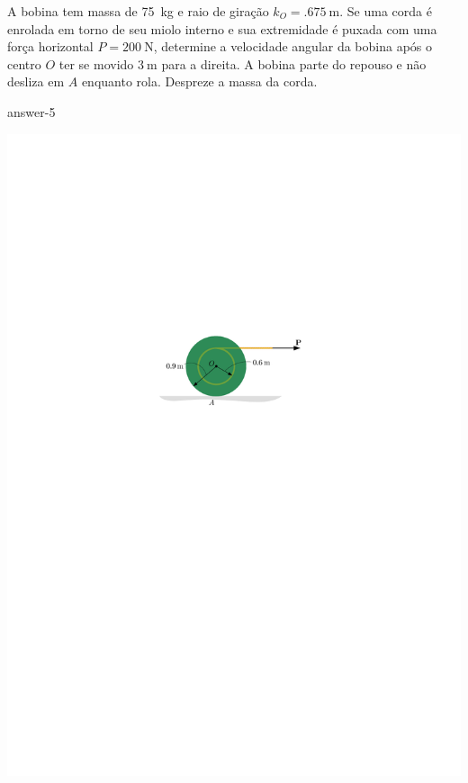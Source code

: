 \item A bobina tem massa de \SI{75}{\kilogram} e raio de giração $k_{O}=\SI{.675}{\meter}$. Se uma corda é enrolada em torno de seu miolo interno e sua extremidade é puxada com uma força horizontal $P=\SI{200}{\newton}$, determine a velocidade angular da bobina após o centro $O$ ter se movido $\SI{3}{\meter}$ para a direita. A bobina parte do repouso e não desliza em $A$ enquanto rola. Despreze a massa da corda.

{answer-5}

\vspace{-1cm}
\begin{flushright}
	\includegraphics[scale=1.2]{../../images/draw_2_1}
\end{flushright}